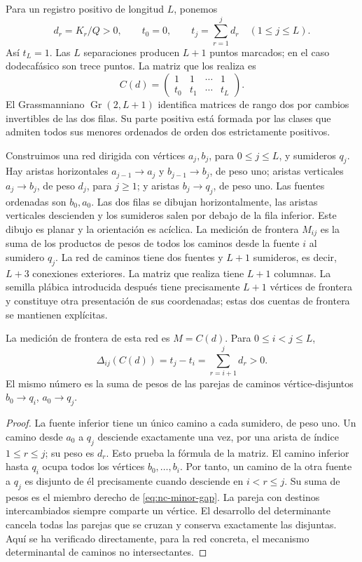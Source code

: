 Para un registro positivo de longitud \(L\), ponemos
\[
 d_r=K_r/Q>0,\qquad t_0=0,\qquad
 t_j=\sum_{r=1}^jd_r\quad(1\le j\le L).
\]
Así \(t_L=1\). Las \(L\) separaciones producen \(L+1\) puntos marcados;
en el caso dodecafásico son trece puntos. La matriz que los realiza es
\begin{equation}
 C(d)=\begin{pmatrix}1&1&\cdots&1\\t_0&t_1&\cdots&t_L\end{pmatrix}.
 \label{eq:nc-path-matrix}
\end{equation}
El Grassmanniano \(\operatorname{Gr}(2,L+1)\) identifica matrices de rango
dos por cambios invertibles de las dos filas. Su parte positiva está formada
por las clases que admiten todos sus menores ordenados de orden dos
estrictamente positivos.

Construimos una red dirigida con vértices \(a_j,b_j\), para
\(0\le j\le L\), y sumideros \(q_j\). Hay aristas horizontales
\(a_{j-1}\to a_j\) y \(b_{j-1}\to b_j\), de peso uno; aristas verticales
\(a_j\to b_j\), de peso \(d_j\), para \(j\ge1\); y aristas
\(b_j\to q_j\), de peso uno. Las fuentes ordenadas son \(b_0,a_0\).
Las dos filas se dibujan horizontalmente, las aristas verticales descienden
y los sumideros salen por debajo de la fila inferior. Este dibujo es planar
y la orientación es acíclica. La medición de frontera \(M_{ij}\) es la
suma de los productos de pesos de todos los caminos desde la fuente \(i\)
al sumidero \(q_j\).
La red de caminos tiene dos fuentes y \(L+1\) sumideros, es decir,
\(L+3\) conexiones exteriores. La matriz que realiza tiene \(L+1\)
columnas. La semilla plábica introducida después tiene precisamente
\(L+1\) vértices de frontera y constituye otra presentación de sus
coordenadas; estas dos cuentas de frontera se mantienen explícitas.

\begin{theorem}
\label{thm:nc-network}
La medición de frontera de esta red es \(M=C(d)\). Para
\(0\le i<j\le L\),
\begin{equation}
 \Delta_{ij}(C(d))=t_j-t_i=\sum_{r=i+1}^{j}d_r>0.
 \label{eq:nc-minor-gap}
\end{equation}
El mismo número es la suma de pesos de las parejas de caminos
vértice-disjuntos \(b_0\to q_i\), \(a_0\to q_j\).
\end{theorem}
\begin{proof}
La fuente inferior tiene un único camino a cada sumidero, de peso uno.
Un camino desde \(a_0\) a \(q_j\) desciende exactamente una vez, por una
arista de índice \(1\le r\le j\); su peso es \(d_r\). Esto prueba la
fórmula de la matriz. El camino inferior hasta \(q_i\) ocupa todos los
vértices \(b_0,\ldots,b_i\). Por tanto, un camino de la otra fuente a
\(q_j\) es disjunto de él precisamente cuando desciende en
\(i<r\le j\). Su suma de pesos es el miembro derecho de
\eqref{eq:nc-minor-gap}. La pareja con destinos intercambiados siempre
comparte un vértice. El desarrollo del determinante cancela todas las
parejas que se cruzan y conserva exactamente las disjuntas. Aquí se ha
verificado directamente, para la red concreta, el mecanismo determinantal
de caminos no intersectantes.
\end{proof}

